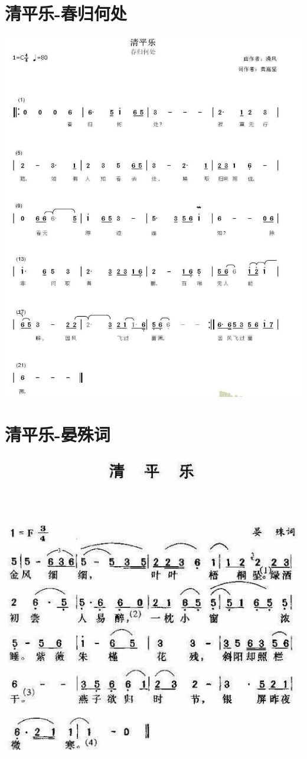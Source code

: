 \documentclass[cn,pad,twocol]{elegantbook}
\begin{document}
\section{清平乐-春归何处}\includegraphics[width=\textwidth]{dongxiao/20200411-清平乐-春归何处.jpg}
\section{清平乐-晏殊词}\includegraphics[width=\textwidth]{dongxiao/20200411-清平乐-晏殊.jpg}
\end{document}
